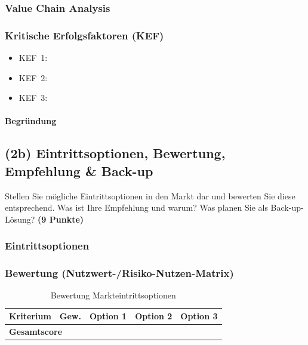 \documentclass[
%
ngerman %
%
numeric %
]{wbh-assignment}
\begin{document}
\subsubsection{Value Chain Analysis}

\subsubsection{Kritische Erfolgsfaktoren (KEF)}
\begin{itemize}
  \item KEF~1: %
  \item KEF~2: %
  \item KEF~3: %
\end{itemize}

\paragraph{Begründung}

\subsection{(2b) Eintrittsoptionen, Bewertung, Empfehlung \& Back-up}
\begin{aufgabenstellung}
Stellen Sie mögliche Eintrittsoptionen in den Markt dar und bewerten Sie diese entsprechend. Was ist Ihre Empfehlung und warum? Was planen Sie als Back-up-Lösung? \textbf{(9 Punkte)}
\end{aufgabenstellung}

\vspace*{5mm}

\subsubsection{Eintrittsoptionen}

\subsubsection{Bewertung (Nutzwert-/Risiko-Nutzen-Matrix)}
\begin{table}[htb!]
\centering
\caption{Bewertung Markteintrittsoptionen}
\begin{tabular}{l r r r r}
\textbf{Kriterium} & \textbf{Gew.} & \textbf{Option 1} & \textbf{Option 2} & \textbf{Option 3} \\
\hline
\multicolumn{2}{l}{\textbf{Gesamtscore}} & & & \\
\end{tabular}
\end{table}
\end{document}
